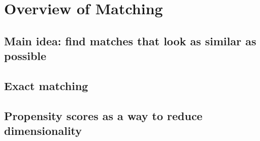 \documentclass[11pt,titlepage]{article}
\begin{document}
\section{Overview of Matching}
\subsection{Main idea: find matches that look as similar as possible}
\subsection{Exact matching}
\subsection{Propensity scores as a way to reduce dimensionality}

\begin{comment}
[From earlier version.]
 Similar to exact matching, propensity score matching is simply a means
to obtain a balanced dataset, and the
variance of the sample ATT is the same as in Equation~\ref{VarATT}.
The only difference is the fact that the missing potential outcome
$\hat{y}_{0i} | t_i=1$ is now estimated by the matched control unit \emph{via the propensity
score}.  Since the propensity score does not estimate any population
parameter and serves its role purely as a ``balancing score'', it does
not introduce any added uncertainty to the variance of the treatment
effect.\footnote{There is one slight exception to this, namely that
  ties in the propensity score are resolved by a random draw.  This is
  a scenario that is likely to happen when the explanatory covariates
  are largely categorical.  Even in this instance, reporting estimates
  from one draw of matched pairs is correct (akin to drawing a random
  sample from a population), but to avoid potentially ``spurious'' findings, the 
  user might well be advised to impute
  missing potential outcomes several times and combine estimates
  across these datasets via standard multiple imputation rules
  (see \citealt{rubin87}).}  (Note, however, that knowledge of the propensity score might decrease the
variance bound for the ATT, but not the ATE
(\citealt{frolich02,hahn98,HirImbRid02}).)  In fact, this variance
estimate might even be conservative for the sample ATT, providing
over-coverage compared to the variance conditional on the
covariates (\citealt{AbaImbND}).
If on the other hand we are interested in the population ATT, the
variance may be estimated by the bootstrap, or even the Neyman
estimate in Note~\ref{neyman} (\citealt{ImbensNDb}, \citealt[Chapter
6]{ImbRubND}).
\end{comment}
\end{document}
